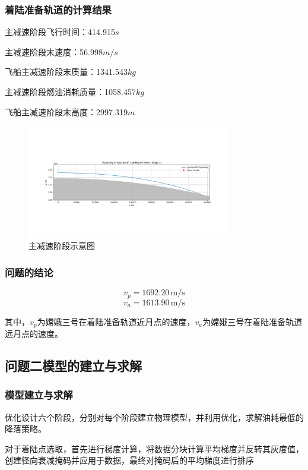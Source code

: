 \documentclass{ctexart}
\begin{document}
	\subsubsection{着陆准备轨道的计算结果}
主减速阶段飞行时间：414.915\(s\)

主减速阶段末速度：56.998\(m/s\)

飞船主减速阶段末质量：1341.543\(kg\)

主减速阶段燃油消耗质量：1058.457\(kg\)

飞船主减速阶段末高度：2997.319\(m\)

    \begin{figure}[H] %
        \centering %
        \includegraphics[width=0.8\textwidth]{"./picture/stage1.png"} %
        \caption{主减速阶段示意图} %
        \label{fig:example} %
    \end{figure}
	\subsubsection{问题的结论}

\[v_p = 1692.20 \, \text{m} / \text{s}\]
\[v_a = 1613.90 \, \text{m} / \text{s}\]

其中，\(v_p\)为嫦娥三号在着陆准备轨道近月点的速度，\(v_a\)为嫦娥三号在着陆准备轨道远月点的速度。
    \subsection{问题二模型的建立与求解}


\subsubsection{模型建立与求解}
优化设计六个阶段，分别对每个阶段建立物理模型，并利用优化，求解油耗最低的降落策略。

对于着陆点选取，首先进行梯度计算，将数据分块计算平均梯度并反转其灰度值，创建径向衰减掩码并应用于数据，最终对掩码后的平均梯度进行排序
\end{document}
